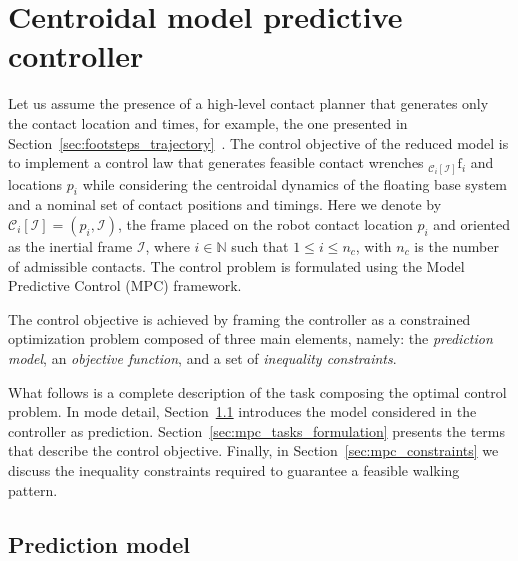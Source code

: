 \section{Centroidal model predictive controller}
\label{sec:reduced_mpc}
Let us assume the presence of a high-level contact planner that generates only the contact location and times, for example, the one presented in Section~\ref{sec:footsteps_trajectory}~\citep{8594277}.
The control objective of the reduced model is to implement a control law that generates feasible contact wrenches ${}_{\mathcal{C}_i[\mathcal{I}]}\mathrm{f}_i$ and locations $p_i$ while considering the centroidal dynamics of the floating base system and a nominal set of contact positions and timings. Here we denote by $\mathcal{C}_i[\mathcal{I}] = (p_i, \mathcal{I})$, the frame placed on the robot contact location $p_i$ and oriented as the inertial frame $\mathcal{I}$, where $i\in\mathbb{N}$ such that $1\le i \le n_c$, with $n_c$ is the number of admissible contacts. The control problem is formulated using the Model Predictive Control (MPC) framework. 
\par
The control objective is achieved by framing the controller as a constrained optimization problem composed of three main elements, namely: the \emph{prediction model}, an \emph{objective function}, and a set of \emph{inequality constraints}.
\par
What follows is a complete description of the task composing the optimal control problem. In mode detail, Section~\ref{sec:centroidal_mpc_dynamics} introduces the model considered in the controller as prediction. Section~\ref{sec:mpc_tasks_formulation} presents the terms that describe the control objective. Finally, in Section~\ref{sec:mpc_constraints} we discuss the inequality constraints required to guarantee a feasible walking pattern.

\subsection{Prediction model}
\label{sec:centroidal_mpc_dynamics}

